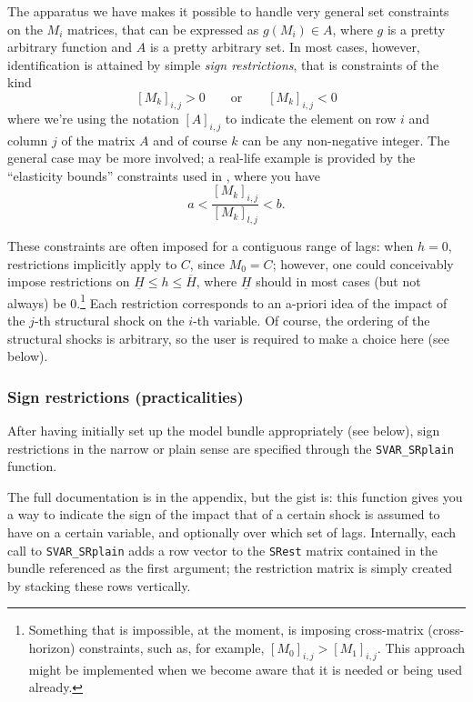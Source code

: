 \documentclass[a4paper,10pt]{article}
\begin{document}
The apparatus we have makes it possible to handle very general set
constraints on the $M_i$ matrices, that can be expressed as
$g(M_i) \in A$, where $g$ is a pretty arbitrary function and $A$ is a
pretty arbitrary set. In most cases, however, identification is
attained by simple \emph{sign restrictions}, that is constraints of
the kind
\[
  [M_k]_{i,j} > 0 \qquad \mathrm{or} \qquad [M_k]_{i,j} < 0
\]
where we're using the notation $[A]_{i,j}$ to indicate the element on row
$i$ and column $j$ of the matrix $A$ and of course $k$ can be any
non-negative integer. The general case may be more involved; a
real-life example is provided by the ``elasticity bounds'' constraints
used in \citet{KilianMurphy2014}, where you have
\[
  a < \frac{[M_k]_{i,j}}{[M_k]_{l,j}} < b .
\]

These constraints are often imposed for a contiguous range of lags:
when $h=0$, restrictions implicitly apply to $C$, since $M_0 = C$;
however, one could conceivably impose restrictions on
$\underline{H} \le h \le \overline{H}$, where $\underline{H}$ should
in most cases (but not always) be 0.\footnote{Something that is impossible,
  at the moment, is imposing cross-matrix (cross-horizon) constraints, such 
  as, for example, $[M_0]_{i,j} > [M_1]_{i,j}$. This approach might be 
  implemented when we become aware that it is needed or being used 
  already.} Each restriction corresponds to an
a-priori idea of the impact of the $j$-th structural shock on the
$i$-th variable. Of course, the ordering of the structural shocks is
arbitrary, so the user is required to make a choice here (see below).

\subsubsection{Sign restrictions (practicalities)}

After having initially set up the model bundle appropriately (see
below), sign restrictions in the narrow or plain sense are specified
through the \texttt{SVAR\_SRplain} function.

The full documentation is in the appendix, but the gist is: this
function gives you a way to indicate the sign of the impact that of a
certain shock is assumed to have on a certain variable, and optionally
over which set of lags. Internally, each call to
\texttt{SVAR\_SRplain} adds a row vector to the \texttt{SRest} matrix
contained in the bundle referenced as the first argument; the
restriction matrix is simply created by stacking these rows
vertically.
\end{document}
